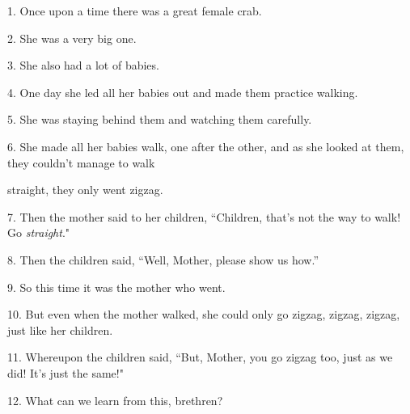 \setcounter{footnote}{0}

1. Once upon a time there was a great female crab.

2. She was a very big one.

3. She also had a lot of babies.

4. One day she led all her babies out and made them practice walking.

5. She was staying behind them and watching them carefully.

6. She made all her babies walk, one after the other, and as she looked at them,
they couldn't manage to walk

straight, they only went zigzag.

7. Then the mother said to her children, ``Children, that's not the way
to walk! Go \textit{straight}."

8. Then the children said, ``Well, Mother, please show us how.''

9. So this time it was the mother who went.

10. But even when the mother walked, she could only go zigzag, zigzag, zigzag,
just like her children.

11. Whereupon the children said, ``But, Mother, you go zigzag too, just
as we did! It's just the same!"

12. What can we learn from this, brethren?


